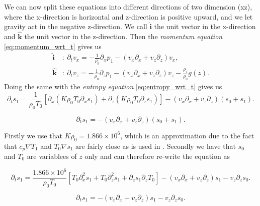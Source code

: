 \documentclass{article}
\begin{document}
We can now split these equations into different directions of two dimension (xz), where the x-direction is horizontal and z-direction is positive upward, and we let gravity act in the negative z-direction. We call $\mathbf{\hat{i}}$ the unit vector in the x-direction and $\mathbf{\hat{k}}$ the unit vector in the z-direction. Then the \textit{momentum equation} \ref{eq:momentum_wrt_t} gives us
\begin{align}
    \mathbf{\hat{i}}&:\ \partial_t v_x = -\frac{1}{\rho_0}\partial_x p_1 - (v_x\partial_x + v_z\partial_z)v_x, \label{eq:momentum_wrt_i}\\
    \mathbf{\hat{k}}&:\ \partial_t v_z = -\frac{1}{\rho_0}\partial_z p_1 - (v_x\partial_x + v_z\partial_z)v_z - \frac{\rho_1}{\rho_0}g(z). \label{eq:momentum_wrt_k}
\end{align}
Doing the same with the \textit{entropy equation} \ref{eq:entropy_wrt_t} gives us
\begin{equation*}
    \partial_t s_1 = \frac{1}{\rho_0 T_0}\left[ \partial_x (K\rho_0T_0\partial_xs_1) + \partial_z (K\rho_0T_0\partial_z s_1)\right] - (v_x\partial_x+v_z\partial_z)(s_0+s_1).
\end{equation*}

\begin{equation*}
    \partial_t s_1 = - (v_x\partial_x+v_z\partial_z)(s_0+s_1).
\end{equation*}

Firstly we use that $K\rho_0=1.866\times10^6$, which is an approximation due to the fact that $c_p \nabla T_1$ and $T_0 \nabla s_1$ are fairly close as is used in \citep{1999ApJS..121..247L}. Secondly we have that $s_0$ and $T_0$ are variablees of $z$ only and can therefore re-write the equation as

\begin{equation}
    \partial_t s_1 = \frac{1.866\times10^6}{\rho_0 T_0}\left[ T_0\partial^2_x s_1 + T_0\partial_z^2s_1 +\partial_z s_1 \partial_z T_0 \right] - (v_x\partial_x+v_z\partial_z)s_1 - v_z\partial_z s_0.
\end{equation}

\begin{equation}
    \partial_t s_1 = - (v_x\partial_x+v_z\partial_z)s_1 - v_z\partial_z s_0.
\end{equation}
\end{document}
